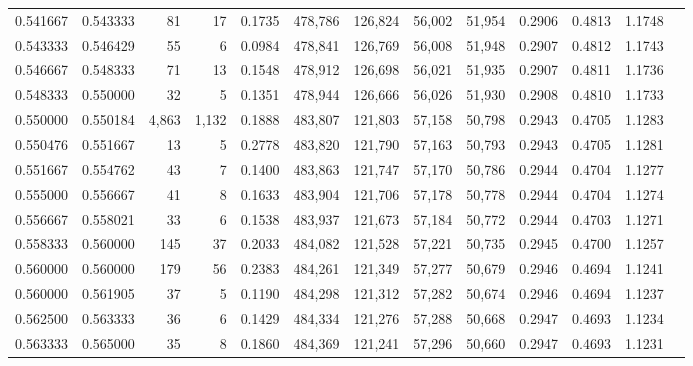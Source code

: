 \begin{tabular}{rrrrrrrrrrrrr}
0.541667 & 0.543333 &     81 &     17 &                                     0.1735 & 478,786 & 126,824 &  56,002 &  51,954 & 0.2906 & 0.4813 & 1.1748 \\
0.543333 & 0.546429 &     55 &      6 &                                     0.0984 & 478,841 & 126,769 &  56,008 &  51,948 & 0.2907 & 0.4812 & 1.1743 \\
0.546667 & 0.548333 &     71 &     13 &                                     0.1548 & 478,912 & 126,698 &  56,021 &  51,935 & 0.2907 & 0.4811 & 1.1736 \\
0.548333 & 0.550000 &     32 &      5 &                                     0.1351 & 478,944 & 126,666 &  56,026 &  51,930 & 0.2908 & 0.4810 & 1.1733 \\
0.550000 & 0.550184 &  4,863 &  1,132 &                                     0.1888 & 483,807 & 121,803 &  57,158 &  50,798 & 0.2943 & 0.4705 & 1.1283 \\
0.550476 & 0.551667 &     13 &      5 &                                     0.2778 & 483,820 & 121,790 &  57,163 &  50,793 & 0.2943 & 0.4705 & 1.1281 \\
0.551667 & 0.554762 &     43 &      7 &                                     0.1400 & 483,863 & 121,747 &  57,170 &  50,786 & 0.2944 & 0.4704 & 1.1277 \\
0.555000 & 0.556667 &     41 &      8 &                                     0.1633 & 483,904 & 121,706 &  57,178 &  50,778 & 0.2944 & 0.4704 & 1.1274 \\
0.556667 & 0.558021 &     33 &      6 &                                     0.1538 & 483,937 & 121,673 &  57,184 &  50,772 & 0.2944 & 0.4703 & 1.1271 \\
0.558333 & 0.560000 &    145 &     37 &                                     0.2033 & 484,082 & 121,528 &  57,221 &  50,735 & 0.2945 & 0.4700 & 1.1257 \\
0.560000 & 0.560000 &    179 &     56 &                                     0.2383 & 484,261 & 121,349 &  57,277 &  50,679 & 0.2946 & 0.4694 & 1.1241 \\
0.560000 & 0.561905 &     37 &      5 &                                     0.1190 & 484,298 & 121,312 &  57,282 &  50,674 & 0.2946 & 0.4694 & 1.1237 \\
0.562500 & 0.563333 &     36 &      6 &                                     0.1429 & 484,334 & 121,276 &  57,288 &  50,668 & 0.2947 & 0.4693 & 1.1234 \\
0.563333 & 0.565000 &     35 &      8 &                                     0.1860 & 484,369 & 121,241 &  57,296 &  50,660 & 0.2947 & 0.4693 & 1.1231 \\

\end{tabular}
